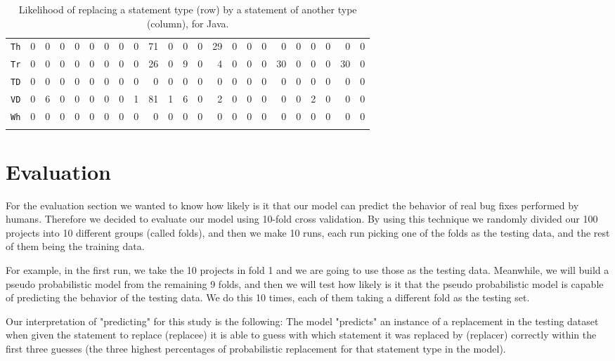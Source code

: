 \documentclass{sig-alternate-05-2015}
\begin{document}
\begin{table*}
{\begin{tabular}{l|rrrrrrrrrrrrrrrrrrrrrr}
\texttt{Th}	&0&	0&	0&	0&	0&	0&	0&	0&	71&	0&	0&	0&	29&	0&	0&	0&	0&	0&	0&	0&	0&	0\\
\texttt{Tr}	&0&	0&	0&	0&	0&	0&	0&	0&	26&	0&	9&	0&	4&	0&	0&	0&	30&	0&	0&	0&	30&	0\\
\texttt{TD}	&0&	0&	0&	0&	0&	0&	0&	0&	0&	0&	0&	0&	0&	0&	0&	0&	0&	0&	0&	0&	0&	0\\
\texttt{VD}	&0&	6&	0&	0&	0&	0&	0&	1&	81&	1&	6&	0&	2&	0&	0&	0&	0&	0&	2&	0&	0&	0\\
\texttt{Wh}	&0&	0&	0&	0&	0&	0&	0&	0&	0&	0&	0&	0&	0&	0&	0&	0&	0&	0&	0&	0&	0&	0\\
			\\ \bottomrule
		\end{tabular}
		}
		\caption{Likelihood of replacing a statement type (row) by a statement of
          another type (column), for Java.}\label{tab:likeliness}
\end{table*}


\section{Evaluation}\label{sec:stmtstudy}
For the evaluation section we wanted to know how likely is it that our model can predict the behavior of real bug fixes performed by humans.
Therefore we decided to evaluate our model using 10-fold cross validation. By using this technique we randomly divided our 100 projects into 10 different groups (called folds), and then we make 10 runs, each run picking one of the folds as the testing data, and the rest of them being the training data.

For example, in the first run, we take the 10 projects in fold 1 and we are going to use those as the testing data. Meanwhile, we will build a pseudo probabilistic model from the remaining 9 folds, and then we will test how likely is it that the pseudo probabilistic model is capable of predicting the behavior of the testing data. We do this 10 times, each of them taking a different fold as the testing set.

Our interpretation of "predicting" for this study is the following:
The model "predicts" an instance of a replacement in the testing dataset when given the statement to replace (replacee) it is able to guess with which statement it was replaced by (replacer) correctly within the first three guesses (the three highest percentages of probabilistic replacement for that statement type in the model).
\end{document}
